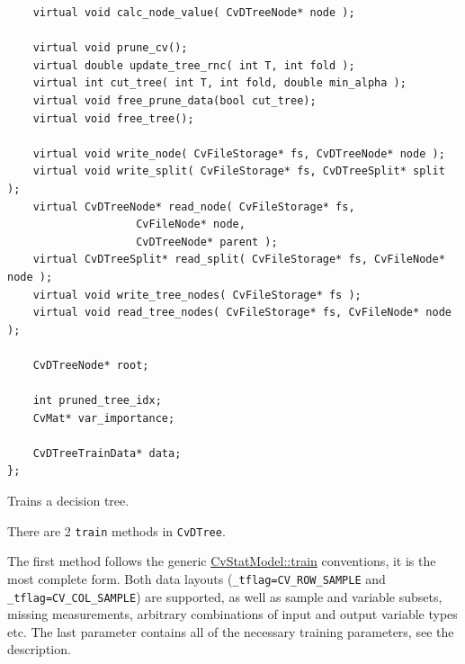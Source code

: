 \begin{lstlisting}
    virtual void calc_node_value( CvDTreeNode* node );

    virtual void prune_cv();
    virtual double update_tree_rnc( int T, int fold );
    virtual int cut_tree( int T, int fold, double min_alpha );
    virtual void free_prune_data(bool cut_tree);
    virtual void free_tree();

    virtual void write_node( CvFileStorage* fs, CvDTreeNode* node );
    virtual void write_split( CvFileStorage* fs, CvDTreeSplit* split );
    virtual CvDTreeNode* read_node( CvFileStorage* fs, 
				    CvFileNode* node, 
				    CvDTreeNode* parent );
    virtual CvDTreeSplit* read_split( CvFileStorage* fs, CvFileNode* node );
    virtual void write_tree_nodes( CvFileStorage* fs );
    virtual void read_tree_nodes( CvFileStorage* fs, CvFileNode* node );

    CvDTreeNode* root;

    int pruned_tree_idx;
    CvMat* var_importance;

    CvDTreeTrainData* data;
};
\end{lstlisting}



Trains a decision tree.


There are 2 \texttt{train} methods in \texttt{CvDTree}.

The first method follows the generic \href{#CvStatModel.3A.3Atrain}{CvStatModel::train} conventions,  it is the most complete form. Both data layouts (\texttt{\_tflag=CV\_ROW\_SAMPLE} and \texttt{\_tflag=CV\_COL\_SAMPLE}) are supported, as well as sample and variable subsets, missing measurements, arbitrary combinations of input and output variable types etc. The last parameter contains all of the necessary training parameters, see the  description.

